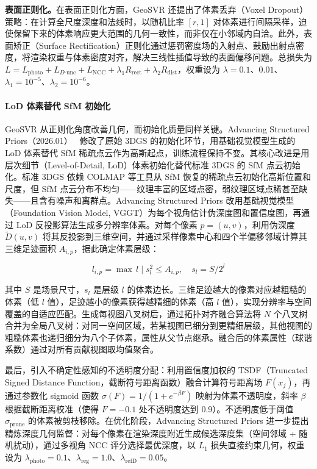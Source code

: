 \textbf{表面正则化。}在表面正则化方面，GeoSVR 还提出了体素丢弃（Voxel Dropout）策略：在计算全尺度深度和法线时，以随机比率 $[r, 1]$ 对体素进行间隔采样，迫使保留下来的体素响应更大范围的几何一致性，而非仅在小邻域内自洽。此外，表面矫正（Surface Rectification）正则化通过惩罚密度场的入射点、鼓励出射点密度，将渲染权重与体素密度对齐，解决三线性插值导致的表面偏移问题。总损失为 $L = L_{\text{photo}} + L_{D\text{-unc}} + L_{\text{NCC}} + \lambda_1 R_{\text{rect}} + \lambda_2 R_{\text{dist}}$，权重设为 $\lambda = 0.1$、$0.01$、$\lambda_1 = 10^{-5}$、$\lambda_2 = 10^{-6}$。

\paragraph{LoD 体素替代 SfM 初始化}

GeoSVR 从正则化角度改善几何，而初始化质量同样关键。Advancing Structured Priors（2026.01）~\cite{2601_17720} 修改了原始 3DGS 的初始化环节，用基础视觉模型生成的 LoD 体素替代 SfM 稀疏点云作为高斯起点，训练流程保持不变。其核心改进是用层次细节（Level-of-Detail, LoD）体素初始化替代标准 3DGS 的 SfM 点云初始化。标准 3DGS 依赖 COLMAP 等工具从 SfM 恢复的稀疏点云初始化高斯位置和尺度，但 SfM 点云分布不均匀——纹理丰富的区域点密，弱纹理区域点稀甚至缺失——且含有噪声和离群点。Advancing Structured Priors 改用基础视觉模型（Foundation Vision Model, VGGT）为每个视角估计伪深度图和置信度图，再通过 LoD 反投影算法生成多分辨率体素。对每个像素 $p=(u,v)$，利用伪深度 $\tilde{D}(u,v)$ 将其反投影到三维空间，并通过采样像素中心和四个半偏移邻域计算其三维足迹面积 $A_{i,p}$，据此确定体素层级：

\begin{equation}
    l_{i,p} = \max\, l \;\vert\; s_l^2 \leq A_{i,p}, \quad s_l = S/2^l
\end{equation}

其中 $S$ 是场景尺寸，$s_l$ 是层级 $l$ 的体素边长。三维足迹越大的像素对应越粗糙的体素（低 $l$ 值），足迹越小的像素获得越精细的体素（高 $l$ 值），实现分辨率与空间覆盖的自适应匹配。生成每视图八叉树后，通过拓扑对齐融合算法将 $N$ 个八叉树合并为全局八叉树：对同一空间区域，若某视图已细分到更精细层级，其他视图的粗糙体素也递归细分为八个子体素，属性从父节点继承。融合后的体素属性（球谐系数）通过对所有贡献视图取均值聚合。

最后，引入不确定性感知的不透明度分配：利用置信度加权的 TSDF（Truncated Signed Distance Function，截断符号距离函数）融合计算符号距离场 $F(x_j)$，再通过参数化 sigmoid 函数 $\sigma(F) = 1/(1+e^{-\beta F})$ 映射为体素不透明度，斜率 $\beta$ 根据截断距离校准（使得 $F=-0.1$ 处不透明度达到 0.9）。不透明度低于阈值 $\sigma_{\text{prune}}$ 的体素被剪枝移除。在优化阶段，Advancing Structured Priors 进一步提出精炼深度几何监督：对每个像素在渲染深度附近生成候选深度集（空间邻域 + 随机扰动），通过多视角 NCC 评分选择最优深度，以 $L_1$ 损失直接约束几何，权重设为 $\lambda_{\text{photo}} = 0.1$、$\lambda_{\text{reg}} = 1.0$、$\lambda_{\text{refD}} = 0.05$。


